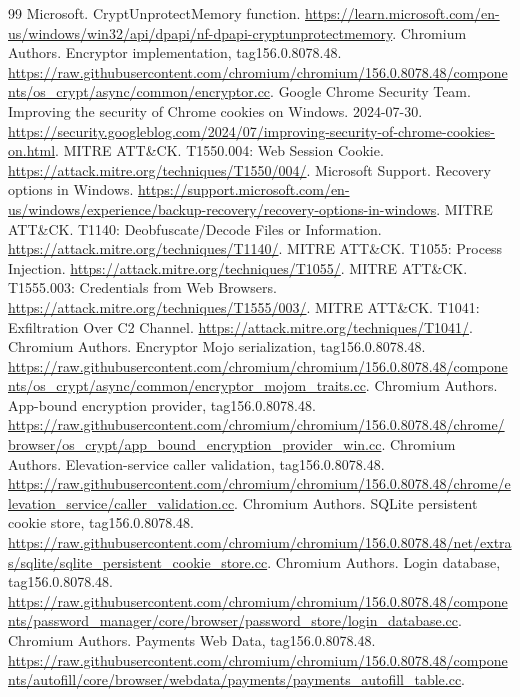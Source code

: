 \documentclass[UTF8,a4paper,zihao=5,fontset=windows]{ctexart}
\begin{document}
\begin{thebibliography}{99}\small
{} Microsoft. CryptUnprotectMemory function. \url{https://learn.microsoft.com/en-us/windows/win32/api/dpapi/nf-dpapi-cryptunprotectmemory}.
 Chromium Authors. Encryptor implementation, tag156.0.8078.48. \url{https://raw.githubusercontent.com/chromium/chromium/156.0.8078.48/components/os_crypt/async/common/encryptor.cc}.
 Google Chrome Security Team. Improving the security of Chrome cookies on Windows. 2024-07-30. \url{https://security.googleblog.com/2024/07/improving-security-of-chrome-cookies-on.html}.
 MITRE ATT\&CK. T1550.004: Web Session Cookie. \url{https://attack.mitre.org/techniques/T1550/004/}.
 Microsoft Support. Recovery options in Windows. \url{https://support.microsoft.com/en-us/windows/experience/backup-recovery/recovery-options-in-windows}.
 MITRE ATT\&CK. T1140: Deobfuscate/Decode Files or Information. \url{https://attack.mitre.org/techniques/T1140/}.
 MITRE ATT\&CK. T1055: Process Injection. \url{https://attack.mitre.org/techniques/T1055/}.
 MITRE ATT\&CK. T1555.003: Credentials from Web Browsers. \url{https://attack.mitre.org/techniques/T1555/003/}.
 MITRE ATT\&CK. T1041: Exfiltration Over C2 Channel. \url{https://attack.mitre.org/techniques/T1041/}.
 Chromium Authors. Encryptor Mojo serialization, tag156.0.8078.48. \url{https://raw.githubusercontent.com/chromium/chromium/156.0.8078.48/components/os_crypt/async/common/encryptor_mojom_traits.cc}.
 Chromium Authors. App-bound encryption provider, tag156.0.8078.48. \url{https://raw.githubusercontent.com/chromium/chromium/156.0.8078.48/chrome/browser/os_crypt/app_bound_encryption_provider_win.cc}.
 Chromium Authors. Elevation-service caller validation, tag156.0.8078.48. \url{https://raw.githubusercontent.com/chromium/chromium/156.0.8078.48/chrome/elevation_service/caller_validation.cc}.
 Chromium Authors. SQLite persistent cookie store, tag156.0.8078.48. \url{https://raw.githubusercontent.com/chromium/chromium/156.0.8078.48/net/extras/sqlite/sqlite_persistent_cookie_store.cc}.
 Chromium Authors. Login database, tag156.0.8078.48. \url{https://raw.githubusercontent.com/chromium/chromium/156.0.8078.48/components/password_manager/core/browser/password_store/login_database.cc}.
 Chromium Authors. Payments Web Data, tag156.0.8078.48. \url{https://raw.githubusercontent.com/chromium/chromium/156.0.8078.48/components/autofill/core/browser/webdata/payments/payments_autofill_table.cc}.

\end{thebibliography}
\end{document}
